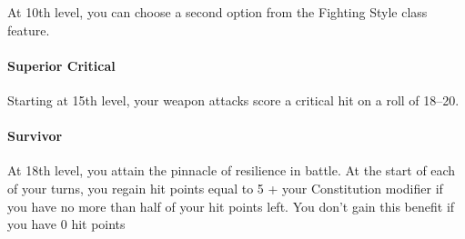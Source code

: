 \documentclass[
]{article}
\begin{document}
At 10th level, you can choose a second option from the Fighting Style
class feature.

\hypertarget{superior-critical}{%
\paragraph{Superior Critical}\label{superior-critical}}

Starting at 15th level, your weapon attacks score a critical hit on a
roll of 18--20.

\hypertarget{survivor}{%
\paragraph{Survivor}\label{survivor}}

At 18th level, you attain the pinnacle of resilience in battle. At the
start of each of your turns, you regain hit points equal to 5 + your
Constitution modifier if you have no more than half of your hit points
left. You don't gain this benefit if you have 0 hit points
\end{document}
